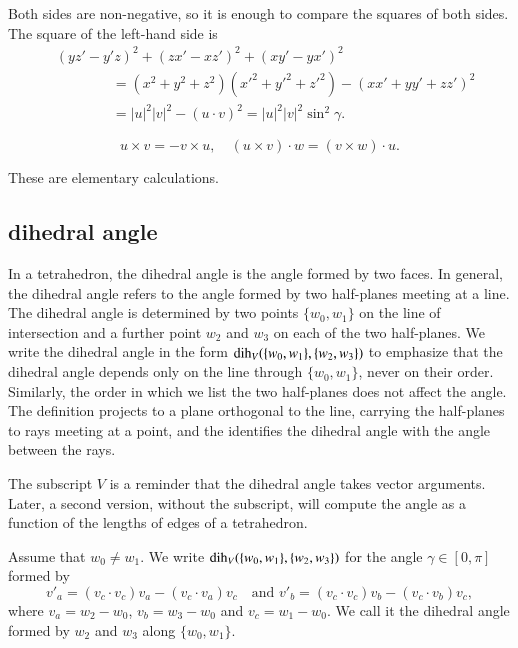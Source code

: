\begin{proved}
   Both sides are non-negative, so it is enough to compare the
   squares of both sides.  The square of the left-hand side is
   $$
   \begin{array}{lll}
   &(y z'- y'z)^2 + (z x' - x z')^2 + (x y' - y x')^2 \\
    &\qquad\qquad=
   (x^2 + y^2 + z^2)(x'^2 + y'^2 + z'^2) - (x x' + y y' + z z')^2
   \\&\qquad\qquad= |u|^2|v|^2 - (u\cdot v)^2 = |u|^2|v|^2 \sin^2\gamma.
   \end{array}
   $$
\swallowed\end{proved}


\begin{lemma}
    $$
    u\times v = -v\times u,\quad
    (u\times v)\cdot w = (v\times w)\cdot u.
    $$
\end{lemma}

\begin{proved}
These are elementary calculations.
\swallowed\end{proved}



\subsection{dihedral angle}

In a tetrahedron, the dihedral angle is
the angle formed by two faces.  In general,
the dihedral angle refers to the angle formed by two half-planes
meeting at a line.  The dihedral angle is determined
by two points $\{w_0,w_1\}$ on the line of intersection
and a further point $w_2$ and $w_3$ on each of the two half-planes.
We write the dihedral angle in the form $\operatorname{dih}_V(\{w_0,w_1\},\{w_2,w_3\})$ to emphasize that the dihedral angle depends only
on the line through $\{w_0,w_1\}$, never on their order.
Similarly, the order in which we list 
the two half-planes does not affect
the angle.  The definition projects
to a plane orthogonal to the line, carrying
the half-planes to rays meeting at a point, and
the identifies the dihedral angle with the angle
between the rays.  

The subscript $V$ is a reminder 
that the dihedral angle takes vector arguments.
Later, a second version, without the subscript, will
compute the angle as a function of the lengths of edges of a 
tetrahedron.



\begin{definition}\label{def:dih} Assume that $w_0\ne w_1$.
We write $\operatorname{dih}_V(\{w_0,w_1\},\{w_2,w_3\})$ for the angle $\gamma\in[0,\pi]$
formed
by 
    $$
    v'_a = (v_c\cdot v_c) v_a - (v_c\cdot v_a) v_c\quad\text{and }v'_b =
            (v_c\cdot v_c) v_b - (v_c\cdot v_b) v_c,
    $$
where $v_a = w_2-w_0$, $v_b=w_3-w_0$ and $v_c=w_1-w_0$.  We call it
the dihedral angle formed by $w_2$ and $w_3$ along $\{w_0,w_1\}$.
\end{definition}

